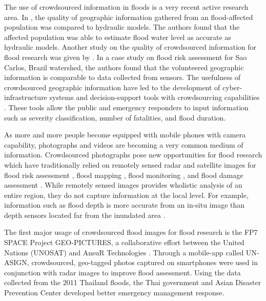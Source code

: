 \documentclass[review]{elsarticle}
\begin{document}
The use of crowdsourced information in floods is a very recent active research area. In \cite{poser}, the quality of geographic information gathered from an flood-affected population was compared to hydraulic models. The authors found that the affected population was able to estimate flood water level as accurate as hydraulic models. Another study on the quality of crowdsourced information for flood research was given by \cite{moreira}. In a case study on flood risk assessment for Sao Carlos, Brazil watershed, the authors found that the volunteered geographic information is comparable to data collected from sensors. The usefulness of crowdsourced geographic information have led to the development of cyber-infrastructure systems and decision-support tools with crowdsourcing capabilities \cite{wan, lieske, horita}. These tools allow the public and emergency responders to input information such as severity classification, number of fatalities, and flood duration.

As more and more people become equipped with mobile phones with camera capability, photographs and videos are becoming a very common medium of information.  Crowdsourced photographs pose new opportunities for flood research which have traditionally relied on remotely sensed radar and satellite images for flood risk assessment \cite{youssef, robertson}, flood mapping \cite{hanhmann}, flood monitoring \cite{tholey, khan}, and flood damage assessment \cite{tralli, sande}. While remotely sensed images provides wholistic analysis of an entire region, they do not capture information at the local level. For example, information such as flood depth is more accurate from an in-situ image than depth sensors located far from the inundated area \cite{ko}.

The first major usage of crowdsourced flood images for flood research is the FP7 SPACE Project GEO-PICTURES, a collaborative effort between the United Nations (UNOSAT) and AnsuR Technologies \cite{unosat}. Through a mobile-app called UN-ASIGN, crowdsourced, geo-tagged photos captured on smartphones were used in conjunction with radar images to improve flood assessment. Using the data collected from the 2011 Thailand floods, the Thai government and Asian Disaster Prevention Center developed better emergency management response.
\end{document}

